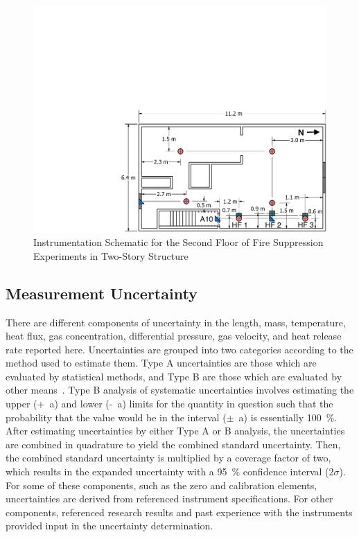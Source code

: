 \documentclass[12pt,oneside]{book}
\begin{document}
\begin{figure}[!ht]
	\includegraphics[width=\columnwidth]{../../DelCo_2014_2015/Drawings/PDFs/CAFS/West_Structure_2nd_Floor_Instrumentation}
	\caption{Instrumentation Schematic for the Second Floor of Fire Suppression Experiments in Two-Story Structure}
	\label{fig:fire_supp_second_2story}
\end{figure}

\clearpage

\subsection{Measurement Uncertainty}
\label{subsec:Uncertainty}

There are different components of uncertainty in the length, mass, temperature, heat flux, gas concentration, differential pressure, gas velocity, and heat release rate reported here. Uncertainties are grouped into two categories according to the method used to estimate them. Type A uncertainties are those which are evaluated by statistical methods, and Type B are those which are evaluated by other means~\cite{Taylor&Kuyatt:1994}. Type B analysis of systematic uncertainties involves estimating the upper (+~a) and lower (-~a) limits for the quantity in question such that the probability that the value would be in the interval ($\pm$~a) is essentially 100~\%. After estimating uncertainties by either Type A or B analysis, the uncertainties are combined in quadrature to yield the combined standard uncertainty. Then, the combined standard uncertainty is multiplied by a coverage factor of two, which results in the expanded uncertainty with a 95~\% confidence interval (2$\sigma$).  For some of these components, such as the zero and calibration elements, uncertainties are derived from referenced instrument specifications. For other components, referenced research results and past experience with the instruments provided input in the uncertainty determination.
\end{document}
